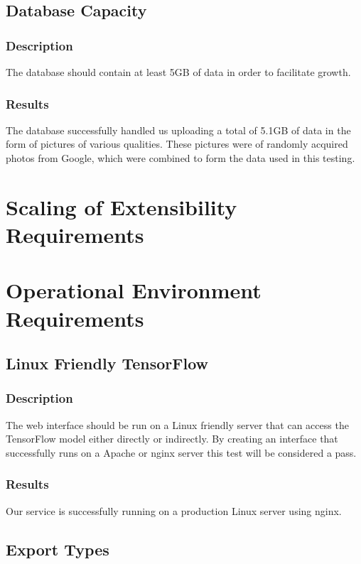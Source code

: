 \documentclass{scrreprt}
\begin{document}
\subsection{Database Capacity}
\subsubsection{Description}

The database should contain at least 5GB of data in order to facilitate growth.

\subsubsection{Results}

The database successfully handled us uploading a total of 5.1GB of data in the
form of pictures of various qualities. These pictures were of randomly acquired
photos from Google, which were combined to form the data used in this testing.

\section{Scaling of Extensibility Requirements}

\section{Operational Environment Requirements}

\subsection{Linux Friendly TensorFlow}
\subsubsection{Description}

The web interface should be run on a Linux friendly server that can access the
TensorFlow model either directly or indirectly. By creating an interface that
successfully runs on a Apache or nginx server this test will be considered a
pass.

\subsubsection{Results}

Our service is successfully running on a production Linux server using nginx.

\subsection{Export Types}
\end{document}
